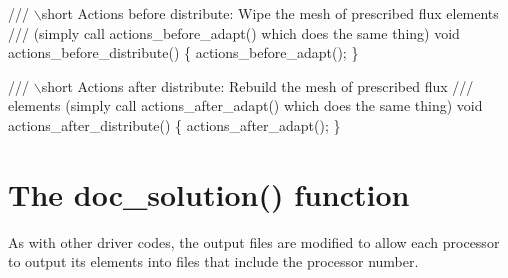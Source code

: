  
\begin{DoxyCodeInclude}
 \textcolor{comment}{/// \(\backslash\)short Actions before distribute: Wipe the mesh of prescribed flux elements}
\textcolor{comment}{ /// (simply call actions\_before\_adapt() which does the same thing)}
\textcolor{comment}{} \textcolor{keywordtype}{void} actions\_before\_distribute()
  \{
   actions\_before\_adapt();
  \}

\end{DoxyCodeInclude}



\begin{DoxyCodeInclude}
 \textcolor{comment}{/// \(\backslash\)short Actions after distribute: Rebuild the mesh of prescribed flux }
\textcolor{comment}{ /// elements (simply call actions\_after\_adapt() which does the same thing)}
\textcolor{comment}{} \textcolor{keywordtype}{void} actions\_after\_distribute()
  \{
   actions\_after\_adapt();
  \}

\end{DoxyCodeInclude}




\hypertarget{index_doc_solution}{}\section{The doc\+\_\+solution() function}\label{index_doc_solution}
As with other driver codes, the output files are modified to allow each processor to output its elements into files that include the processor number.


